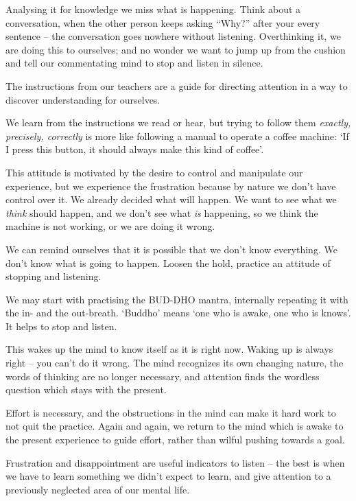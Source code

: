 Analysing it for knowledge we miss what is happening. Think about a
conversation, when the other person keeps asking ``Why?'' after your
every sentence -- the conversation goes nowhere without listening.
Overthinking it, we are doing this to ourselves; and no wonder we want
to jump up from the cushion and tell our commentating mind to stop and
listen in silence.

The instructions from our teachers are a guide for directing attention
in a way to discover understanding for ourselves.

We learn from the instructions we read or hear, but trying to follow
them \emph{exactly, precisely, correctly} is more like following a
manual to operate a coffee machine: `If I press this button, it should
always make this kind of coffee'.

This attitude is motivated by the desire to control and manipulate our
experience, but we experience the frustration because by nature we don't
have control over it. We already decided what will happen. We want to
see what we \emph{think} should happen, and we don't see what \emph{is}
happening, so we think the machine is not working, or we are doing it
wrong.

We can remind ourselves that it is possible that we don't know
everything. We don't know what is going to happen. Loosen the hold,
practice an attitude of stopping and listening.


We may start with practising the BUD-DHO mantra, internally repeating it
with the in- and the out-breath. `Buddho' means `one who is awake, one
who is knows'. It helps to stop and listen.

This wakes up the mind to know itself as it is right now. Waking up is
always right -- you can't do it wrong. The mind recognizes its own
changing nature, the words of thinking are no longer necessary, and
attention finds the wordless question which stays with the present.

Effort is necessary, and the obstructions in the mind can make it hard
work to not quit the practice. Again and again, we return to the mind
which is awake to the present experience to guide effort, rather than
wilful pushing towards a goal.

Frustration and disappointment are useful indicators to listen -- the
best is when we have to learn something we didn't expect to learn, and
give attention to a previously neglected area of our mental life.

